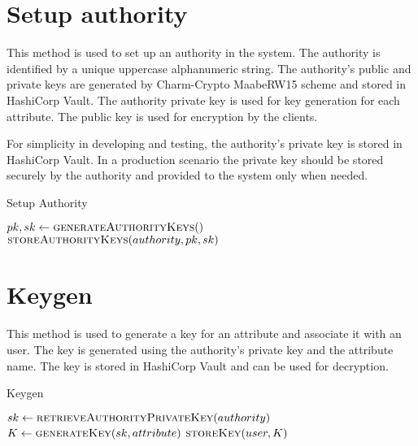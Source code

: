 \documentclass[cic,tc,english]{iiufrgs}
\begin{document}
    \section{Setup authority}
    This method is used to set up an authority in the system. The authority is identified by a unique uppercase alphanumeric string. The authority's public and private keys are generated by Charm-Crypto MaabeRW15\cite{rouselakis2015efficient} scheme and stored in HashiCorp Vault. The authority private key is used for key generation for each attribute. The public key is used for encryption by the clients.

    For simplicity in developing and testing, the authority's private key is stored in HashiCorp Vault. In a production scenario the private key should be stored securely by the authority and provided to the system only when needed.

    \begin{algorithm}
        \caption{Setup Authority}
        \label{alg:setup_authority}
        \begin{algorithmic}[1]
            \State $pk, sk \gets \textsc{generateAuthorityKeys}()$
            \State $\textsc{storeAuthorityKeys}(authority, pk, sk)$
        \EndProcedure
        \end{algorithmic}
    \end{algorithm}

    \section{Keygen}
    This method is used to generate a key for an attribute and associate it with an user. The key is generated using the authority's private key and the attribute name. The key is stored in HashiCorp Vault and can be used for decryption.

    \begin{algorithm}
        \caption{Keygen}
        \label{alg:keygen}
        \begin{algorithmic}[1]
            \State $sk \gets \textsc{retrieveAuthorityPrivateKey}(authority)$
            \State $K \gets \textsc{generateKey}(sk, attribute)$
            \State $\textsc{storeKey}(user, K)$
        \EndProcedure
        \end{algorithmic}
    \end{algorithm}
\end{document}
